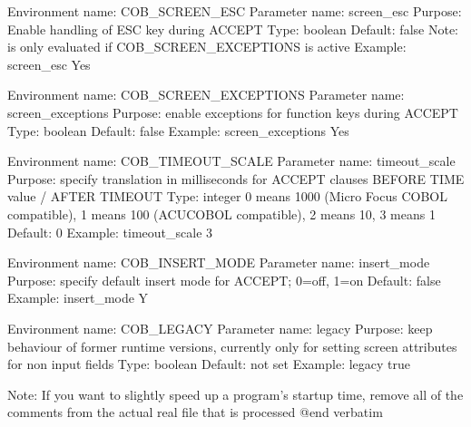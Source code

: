 Environment name:  COB_SCREEN_ESC
  Parameter name:  screen_esc
         Purpose:  Enable handling of ESC key during ACCEPT
            Type:  boolean
         Default:  false
            Note:  is only evaluated if COB_SCREEN_EXCEPTIONS is active
         Example:  screen_esc Yes

Environment name:  COB_SCREEN_EXCEPTIONS
  Parameter name:  screen_exceptions
         Purpose:  enable exceptions for function keys during ACCEPT
            Type:  boolean
         Default:  false
         Example:  screen_exceptions Yes

Environment name:  COB_TIMEOUT_SCALE
  Parameter name:  timeout_scale
         Purpose:  specify translation in milliseconds for ACCEPT clauses
                   BEFORE TIME value / AFTER TIMEOUT
            Type:  integer
                   0 means 1000 (Micro Focus COBOL compatible), 1 means 100
                   (ACUCOBOL compatible), 2 means 10, 3 means 1
         Default:  0
         Example:  timeout_scale 3

Environment name:  COB_INSERT_MODE
  Parameter name:  insert_mode
         Purpose:  specify default insert mode for ACCEPT; 0=off, 1=on
         Default:  false
         Example:  insert_mode Y

Environment name:  COB_LEGACY
  Parameter name:  legacy
         Purpose:  keep behaviour of former runtime versions, currently only
                   for setting screen attributes for non input fields
            Type:  boolean
         Default:  not set
         Example:  legacy true

Note: If you want to slightly speed up a program's startup time, remove all
      of the comments from the actual real file that is processed
@end verbatim

